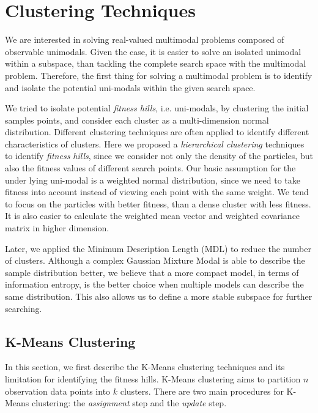 \chapter{Clustering Techniques}
\label{chapter:clustering}

We are interested in solving real-valued multimodal problems composed of observable unimodals.
Given the case, it is easier to solve an isolated unimodal within a subspace,
than tackling the complete search space with the multimodal problem.
Therefore, the first thing for solving a multimodal problem is to identify and isolate 
the potential uni-modals within the given search space.

We tried to isolate potential \textit{fitness hills}, i.e. uni-modals,
by clustering the initial samples points,
and consider each cluster as a multi-dimension normal distribution.
Different clustering techniques are often applied to identify different characteristics of clusters.
Here we proposed a \textit{hierarchical clustering} techniques to identify \textit{fitness hills},
since we consider not only the density of the particles,
but also the fitness values of different search points.
Our basic assumption for the under lying uni-modal is a weighted normal distribution, 
since we need to take fitness into account instead of viewing each point with the same weight.
We tend to focus on the particles with better fitness,
than a dense cluster with less fitness. 
It is also easier to calculate the weighted mean vector and weighted covariance matrix in higher dimension. 

Later, we applied the Minimum Description Length (MDL) to reduce the number of clusters.
Although a complex Gaussian Mixture Modal is able to describe the sample distribution better,
we believe that a more compact model, in terms of information entropy, is the better choice 
when multiple models can describe the same distribution. 
This also allows us to define a more stable subspace for further searching.


\section{K-Means Clustering}
In this section, we first describe the K-Means clustering techniques and its limitation for identifying the fitness hills.
K-Means clustering aims to partition $n$ observation data points into $k$ clusters.
There are two main procedures for K-Means clustering: the \textit{assignment} step and the \textit{update} step.

